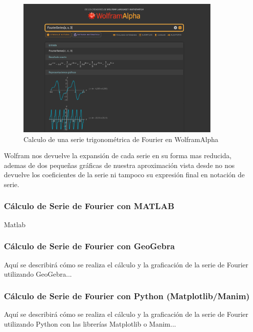 \begin{figure}[H]
	\centering
	\includegraphics[width=0.9\textwidth]{img/chapter02/wolfram_complex_series.png}
	\caption{Calculo de una serie trigonométrica de Fourier en WolframAlpha}
	\label{fig:wolfram-exp-series}  %
\end{figure}
Wolfram nos devuelve la expansión de cada serie en su forma mas reducida, ademas de dos pequeñas gráficas de nuestra aproximación vista desde  no nos devuelve los coeficientes de la serie ni tampoco su expresión final en notación de serie.

\subsubsection{Cálculo de Serie de Fourier con MATLAB}
Matlab 

\subsubsection{Cálculo de Serie de Fourier con GeoGebra}

Aquí se describirá cómo se realiza el cálculo y la graficación de la serie de Fourier utilizando GeoGebra...

\subsubsection{Cálculo de Serie de Fourier con Python (Matplotlib/Manim)}

Aquí se describirá cómo se realiza el cálculo y la graficación de la serie de Fourier utilizando Python con las librerías Matplotlib o Manim...



